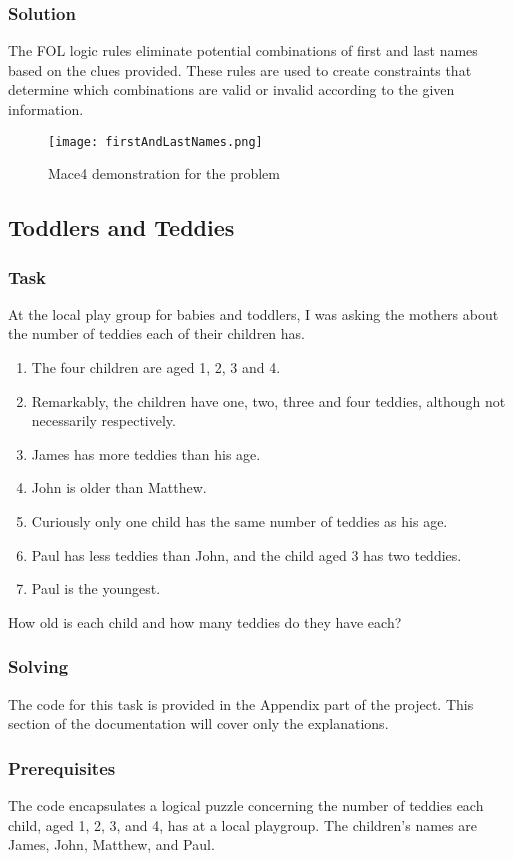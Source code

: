 \documentclass[a4paper,12pt]{report}
\begin{document}
\subsubsection{Solution}

The FOL logic rules eliminate potential combinations of first and last names based on the clues provided. These rules are used to create constraints that determine which combinations are valid or invalid according to the given information.

\begin{figure}[h]
\texttt{[image: firstAndLastNames.png]}
\centering
\caption{Mace4 demonstration for the problem}
\end{figure}

\subsection{Toddlers and Teddies}
\subsubsection{\Large Task}
At the local play group for babies and toddlers, I was asking the mothers about the number of teddies each of their children has.

\begin{enumerate}
    \item The four children are aged 1, 2, 3 and 4.
    \item Remarkably, the children have one, two, three and four teddies, although not necessarily respectively.
    \item James has more teddies than his age. 
    \item John is older than Matthew.
    \item Curiously only one child has the same number of teddies as his age.
    \item Paul has less teddies than John, and the child aged 3 has two teddies.
    \item Paul is the youngest. 
\end{enumerate}
How old is each child and how many teddies do they have each?

\subsubsection{\Large Solving}
The code for this task is provided in the Appendix part of the project. This section of the documentation will cover only the explanations. 
\subsubsection{Prerequisites}
The code encapsulates a logical puzzle concerning the number of teddies each child, aged 1, 2, 3, and 4, has at a local playgroup. The children's names are James, John, Matthew, and Paul.
\end{document}
